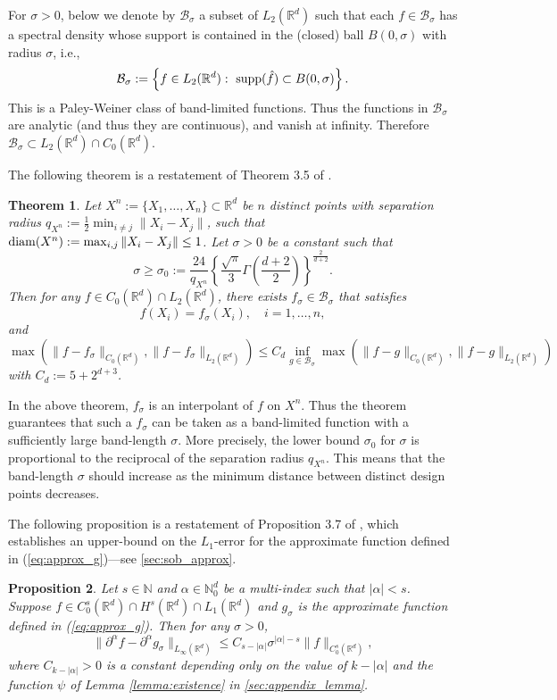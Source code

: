 \documentclass[11pt]{article}
\newtheorem{theorem}{Theorem}
\newtheorem{proposition}[theorem]{Proposition}
\theoremstyle{remark}
\theoremstyle{example}
\theoremstyle{remark}
\newcommand{\N}{\mathbb{N}}
\newcommand{\R}{\mathbb{R}}
\begin{document}
For $\sigma > 0$, below we denote by $\mathcal{B}_\sigma$ a subset of $L_2(\R^d)$ such that each $f \in \mathcal{B}_\sigma$ has a spectral density whose support is contained in the (closed) ball $B(0,\sigma)$ with radius $\sigma$, i.e.,
\[
\mathcal{B}_\sigma := \left\{ f \in L_2(\R^d):\ {\rm supp}(\hat{f}) \subset B(0,\sigma)  \right\}.
\]
This is a Paley-Weiner class of band-limited functions.
Thus the functions in $\mathcal{B}_\sigma$ are analytic (and thus they are continuous), and vanish at infinity. 
Therefore $\mathcal{B}_\sigma \subset L_2(\R^d) \cap C_0(\R^d)$.

The following theorem is a restatement of Theorem 3.5 of \cite{NarWar04}.


\begin{theorem} \label{theo:NarWar04_Th3_5}
Let $X^n := \{ X_1,\dots, X_n \} \subset  \R^d$ be $n$ distinct points with separation radius $q_{X^n} := \frac{1}{2} \min_{i \neq j} \| X_i - X_j \|$, such that ${\rm diam}(X^n) := \max_{i,j} \| X_i - X_j \| \leq 1$.
Let $\sigma > 0$ be a constant such that
\[
\sigma \geq \sigma_0 := \frac{24}{q_{X^n}} \left\{ \frac{\sqrt{\pi}}{3} \Gamma \left( \frac{d+2}{2} \right)  \right\}^{\frac{2}{d+2}}.
\]
Then for any $f \in C_0(\R^d) \cap L_2(\R^d)$, there exists $f_\sigma \in \mathcal{B}_\sigma$ that satisfies
\[
f(X_i)  =  f_\sigma(X_i), \quad i = 1,\dots,n,
\]
and 
$$\max\left( \| f - f_\sigma \|_{C_0(\R^d) },   \| f - f_\sigma \|_{L_2(\R^d)} \right)  
\leq C_d \inf_{g \in \mathcal{B}_\sigma} \max \left( \| f - g \|_{C_0(\R^d)}, \| f - g \|_{L_2(\R^d)} \right)$$
with $C_d:=5 + 2^{d+3}$.
\end{theorem}

In the above theorem, $f_\sigma$ is an interpolant of $f$ on $X^n$.
Thus the theorem guarantees that such a $f_\sigma$ can be taken as a band-limited function with a sufficiently large band-length $\sigma$.
More precisely, the lower bound $\sigma_0$ for $\sigma$ is proportional to the reciprocal of the separation radius $q_{X^n}$. 
This means that the band-length $\sigma$ should increase as the minimum distance between distinct design points decreases. 

The following proposition is a restatement of Proposition 3.7 of \cite{NarWar04}, which establishes an upper-bound on the $L_1$-error for the approximate function defined in (\ref{eq:approx_g})---see \ref{sec:sob_approx}.
\begin{proposition} \label{prop:NarWar04_Prop3_7}
Let $s\in\N$ and $\alpha \in \N_0^{d}$ be a multi-index such that $| \alpha | < s$.
Suppose $f \in C_0^s(\R^d) \cap H^s(\R^d) \cap L_1(\R^d)$ and $g_\sigma$ is the approximate function defined in (\ref{eq:approx_g}).
Then for any $\sigma > 0$,
\[
\| \partial^\alpha f - \partial^\alpha g_\sigma \|_{L_\infty(\R^d)} \leq C_{s-| \alpha |} \sigma^{ |\alpha| - s } \| f \|_{C_0^s(\R^d)},
\]
where $C_{k-| \alpha |} > 0$ is a constant depending only on the value of $k-|\alpha|$ and the function $\psi$ of Lemma \ref{lemma:existence} in \ref{sec:appendix_lemma}. 
\end{proposition}
\end{document}
